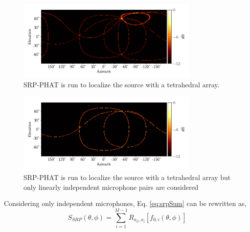 \begin{figure}[h]
    \centering
    \includegraphics[width=0.8\textwidth]{Figures/4mic1srcRes.png}
    \caption{SRP-PHAT is run to localize the source with a tetrahedral array.}
    \label{fig:4mic1src}
\end{figure}
\begin{figure}[h]
    \centering
    \includegraphics[width=0.8\textwidth]{Figures/Ind4mic1srcRes.png}
    \caption{SRP-PHAT is run to localize the source with a tetrahedral array but only linearly independent microphone pairs are considered}
    \label{fig:4mic1srcInd}
\end{figure}
Considering only independent microphones, Eq. \ref{eq:srpSum} can be rewritten as, 
\begin{equation}
    S_{SRP}(\theta,\phi)=\sum\limits_{i=1}^{M-1}{R_{x_0,x_i}[f_{0,i}(\theta,\phi)]}
     \label{eq:srpSumInd}
\end{equation}



